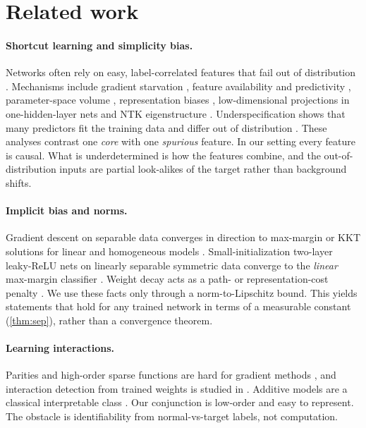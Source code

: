 \documentclass{article}
\theoremstyle{definition}
\theoremstyle{remark}
\renewcommand{\1}{\mathbf{1}}
\begin{document}
\section{Related work}
\label{sec:related}
\paragraph{Shortcut learning and simplicity bias.} Networks often rely on easy, label-correlated features that fail out of distribution \citep{geirhos2020,shah2020}. Mechanisms include gradient starvation \citep{pezeshki2021}, feature availability and predictivity \citep{hermann2020,hermann2024}, parameter-space volume \citep{scimeca2022}, representation biases \citep{lampinen2024}, low-dimensional projections in one-hidden-layer nets \citep{morwani2023,tsoy2024} and NTK eigenstructure \citep{lim2025}. Underspecification shows that many predictors fit the training data and differ out of distribution \citep{damour2022}. These analyses contrast one \emph{core} with one \emph{spurious} feature. In our setting every feature is causal. What is underdetermined is how the features combine, and the out-of-distribution inputs are partial look-alikes of the target rather than background shifts.

\paragraph{Implicit bias and norms.} Gradient descent on separable data converges in direction to max-margin or KKT solutions for linear and homogeneous models \citep{soudry2018,lyu2020,ji2020,chizat2020}. Small-initialization two-layer leaky-ReLU nets on linearly separable symmetric data converge to the \emph{linear} max-margin classifier \citep{lyu2021}. Weight decay acts as a path- or representation-cost penalty \citep{neyshabur2015,savarese2019,ongie2020}. We use these facts only through a norm-to-Lipschitz bound. This yields statements that hold for any trained network in terms of a measurable constant (\cref{thm:sep}), rather than a convergence theorem.

\paragraph{Learning interactions.} Parities and high-order sparse functions are hard for gradient methods \citep{barak2022,abbe2022}, and interaction detection from trained weights is studied in \citet{tsang2018}. Additive models are a classical interpretable class \citep{hastie1990,agarwal2021}. Our conjunction is low-order and easy to represent. The obstacle is identifiability from normal-vs-target labels, not computation.
\end{document}
